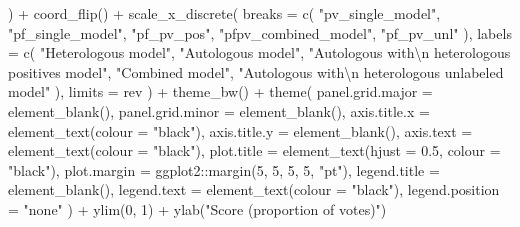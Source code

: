 \documentclass[
  11pt,
  oneside]{book}
\newenvironment{Shaded}{\begin{snugshade}}{\end{snugshade}}
\newcommand{\AttributeTok}[1]{\textcolor[rgb]{0.77,0.63,0.00}{#1}}
\newcommand{\DecValTok}[1]{\textcolor[rgb]{0.00,0.00,0.81}{#1}}
\newcommand{\FloatTok}[1]{\textcolor[rgb]{0.00,0.00,0.81}{#1}}
\newcommand{\FunctionTok}[1]{\textcolor[rgb]{0.00,0.00,0.00}{#1}}
\newcommand{\NormalTok}[1]{#1}
\newcommand{\SpecialCharTok}[1]{\textcolor[rgb]{0.00,0.00,0.00}{#1}}
\newcommand{\StringTok}[1]{\textcolor[rgb]{0.31,0.60,0.02}{#1}}
\begin{document}
\begin{Shaded}
\begin{Highlighting}[]
\NormalTok{  ) }\SpecialCharTok{+}
  \FunctionTok{coord\_flip}\NormalTok{() }\SpecialCharTok{+}
  \FunctionTok{scale\_x\_discrete}\NormalTok{(}
    \AttributeTok{breaks =} \FunctionTok{c}\NormalTok{(}
      \StringTok{"pv\_single\_model"}\NormalTok{, }\StringTok{"pf\_single\_model"}\NormalTok{, }\StringTok{"pf\_pv\_pos"}\NormalTok{,}
      \StringTok{"pfpv\_combined\_model"}\NormalTok{, }\StringTok{"pf\_pv\_unl"}
\NormalTok{    ),}
    \AttributeTok{labels =} \FunctionTok{c}\NormalTok{(}
      \StringTok{"Heterologous model"}\NormalTok{, }\StringTok{"Autologous model"}\NormalTok{,}
      \StringTok{"Autologous with}\SpecialCharTok{\textbackslash{}n}\StringTok{ heterologous positives model"}\NormalTok{,}
      \StringTok{"Combined model"}\NormalTok{,}
      \StringTok{"Autologous with}\SpecialCharTok{\textbackslash{}n}\StringTok{ heterologous unlabeled model"}
\NormalTok{    ),}
    \AttributeTok{limits =}\NormalTok{ rev}
\NormalTok{  ) }\SpecialCharTok{+}
  \FunctionTok{theme\_bw}\NormalTok{() }\SpecialCharTok{+}
  \FunctionTok{theme}\NormalTok{(}
    \AttributeTok{panel.grid.major =} \FunctionTok{element\_blank}\NormalTok{(),}
    \AttributeTok{panel.grid.minor =} \FunctionTok{element\_blank}\NormalTok{(),}
    \AttributeTok{axis.title.x =} \FunctionTok{element\_text}\NormalTok{(}\AttributeTok{colour =} \StringTok{"black"}\NormalTok{),}
    \AttributeTok{axis.title.y =} \FunctionTok{element\_blank}\NormalTok{(),}
    \AttributeTok{axis.text =} \FunctionTok{element\_text}\NormalTok{(}\AttributeTok{colour =} \StringTok{"black"}\NormalTok{),}
    \AttributeTok{plot.title =} \FunctionTok{element\_text}\NormalTok{(}\AttributeTok{hjust =} \FloatTok{0.5}\NormalTok{, }\AttributeTok{colour =} \StringTok{"black"}\NormalTok{),}
    \AttributeTok{plot.margin =}\NormalTok{ ggplot2}\SpecialCharTok{::}\FunctionTok{margin}\NormalTok{(}\DecValTok{5}\NormalTok{, }\DecValTok{5}\NormalTok{, }\DecValTok{5}\NormalTok{, }\DecValTok{5}\NormalTok{, }\StringTok{"pt"}\NormalTok{),}
    \AttributeTok{legend.title =} \FunctionTok{element\_blank}\NormalTok{(),}
    \AttributeTok{legend.text =} \FunctionTok{element\_text}\NormalTok{(}\AttributeTok{colour =} \StringTok{"black"}\NormalTok{),}
    \AttributeTok{legend.position =} \StringTok{"none"}
\NormalTok{  ) }\SpecialCharTok{+}
  \FunctionTok{ylim}\NormalTok{(}\DecValTok{0}\NormalTok{, }\DecValTok{1}\NormalTok{) }\SpecialCharTok{+}
  \FunctionTok{ylab}\NormalTok{(}\StringTok{"Score (proportion of votes)"}\NormalTok{)}
\end{Highlighting}
\end{Shaded}
\end{document}
